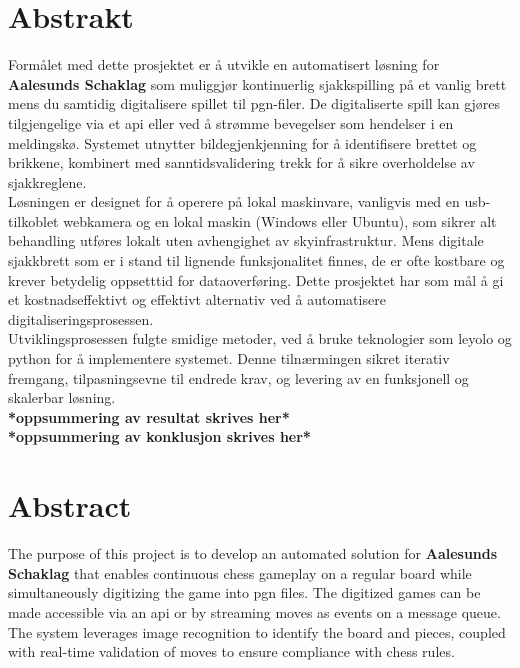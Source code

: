 \chapter*{Abstrakt}

Formålet med dette prosjektet er å utvikle en automatisert løsning for \textbf{Aalesunds Schaklag} som muliggjør kontinuerlig sjakkspilling på et vanlig brett mens du samtidig digitalisere spillet til \gls{pgn}-filer. De digitaliserte spill kan gjøres tilgjengelige via et \gls{api} eller ved å strømme bevegelser som hendelser i en meldingskø. Systemet utnytter bildegjenkjenning for å identifisere brettet og brikkene, kombinert med sanntidsvalidering trekk for å sikre overholdelse av sjakkreglene. \\

Løsningen er designet for å operere på lokal maskinvare, vanligvis med en \acrshort{usb}-tilkoblet webkamera og en lokal maskin (Windows eller Ubuntu), som sikrer alt behandling utføres lokalt uten avhengighet av skyinfrastruktur. Mens digitale sjakkbrett som er i stand til lignende funksjonalitet finnes, de er ofte kostbare og krever betydelig oppsetttid for dataoverføring. Dette prosjektet har som mål å gi et kostnadseffektivt og effektivt alternativ ved å automatisere digitaliseringsprosessen. \\

Utviklingsprosessen fulgte smidige metoder, ved å bruke teknologier som \gls{leyolo} og \gls{python} for å implementere systemet. Denne tilnærmingen sikret iterativ fremgang, tilpasningsevne til endrede krav, og levering av en funksjonell og skalerbar løsning. \\

\textbf{*oppsummering av resultat skrives her*}\\

\textbf{*oppsummering av konklusjon skrives her*}


\newpage


\chapter*{Abstract}

The purpose of this project is to develop an automated solution for \textbf{Aalesunds Schaklag} that enables continuous chess gameplay on a regular board while simultaneously digitizing the game into \gls{pgn} files. The digitized games can be made accessible via an \gls{api} or by streaming moves as events on a message queue. The system leverages image recognition to identify the board and pieces, coupled with real-time validation of moves to ensure compliance with chess rules.\\

